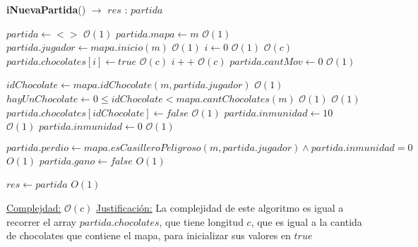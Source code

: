 \documentclass{book}
\newcommand{\bigO}{\mathcal{O}}
\begin{document}
\begin{Algoritmos}


\medskip
	
  	\medskip

    \begin{algorithm}[H]{\textbf{iNuevaPartida}() $\to$ $res$ : $partida$}
        \begin{algorithmic}[1]
            \State $partida \gets <>$                               \Comment $\bigO(1)$
            \State $partida.mapa \gets m$                           \Comment $\bigO(1)$
            \State $partida.jugador \gets mapa.inicio(m)$           \Comment $\bigO(1)$
            \State $i \gets 0$                                      \Comment $\bigO(1)$
                                \Comment $\bigO(c)$
                \State $partida.chocolates[i] \gets true$           \Comment $\bigO(c)$
                \State $i++$                                        \Comment $\bigO(c)$
            \EndWhile
            \State $partida.cantMov \gets 0$                        \Comment $\bigO(1)$

            \State $idChocolate \gets mapa.idChocolate(m, partida.jugador)$             \Comment $\bigO(1)$
            \State $hayUnChocolate \gets 0 \leq idChocolate < mapa.cantChocolates(m)$   \Comment $\bigO(1)$
                                                                   \Comment $\bigO(1)$
                \State $partida.chocolates[idChocolate] \gets false$                    \Comment $\bigO(1)$
                \State $partida.inmunidad \gets 10$                                     \Comment $\bigO(1)$
            \Else
                \State $partida.inmunidad \gets 0$                                      \Comment $\bigO(1)$
            \EndIf

            \State $partida.perdio \gets mapa.esCasilleroPeligroso(m, partida.jugador) \wedge partida.inmunidad = 0$    \Comment $O(1)$
            \State $partida.gano \gets false$                                               \Comment $O(1)$

            \State $res \gets partida$                              \Comment $O(1)$

            \medskip
            \Statex
            \underline{Complejdad:} $\bigO(c)$
            \Statex
            \underline{Justificación:} La complejidad de este algoritmo es igual a recorrer el array $partida.chocolates$, que tiene longitud $c$, que es igual a la cantida de chocolates que contiene el mapa, para inicializar sus valores en $true$
            \end{algorithmic}
    \end{algorithm}


\end{Algoritmos}
\end{document}
